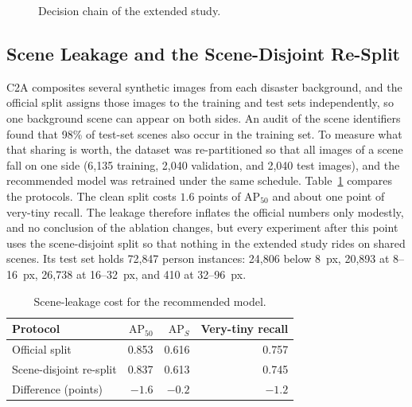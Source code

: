 \begin{figure}[tbp]
  \centering
  \caption{Decision chain of the extended study.}
  \label{fig:partbchain}
\end{figure}

\subsection{Scene Leakage and the Scene-Disjoint Re-Split}
\label{sec:leak}
C2A composites several synthetic images from each disaster background, and the
official split assigns those images to the training and test sets
independently, so one background scene can appear on both sides. An audit of
the scene identifiers found that 98\% of test-set scenes also occur in the
training set. To measure what that sharing is worth, the dataset was
re-partitioned so that all images of a scene fall on one side (6{,}135
training, 2{,}040 validation, and 2{,}040 test images), and the recommended
model was retrained under the same schedule. Table~\ref{tab:leak} compares the
protocols. The clean split costs $1.6$ points of $\mathrm{AP}_{50}$ and about
one point of very-tiny recall. The leakage therefore inflates the official
numbers only modestly, and no conclusion of the ablation changes, but every
experiment after this point uses the scene-disjoint split so that nothing in
the extended study rides on shared scenes. Its test set holds 72{,}847 person
instances: 24{,}806 below 8~px, 20{,}893 at 8--16~px, 26{,}738 at 16--32~px,
and 410 at 32--96~px.

\begin{table}[tbp]
  \centering
  \caption{Scene-leakage cost for the recommended model.}
  \label{tab:leak}
  \begin{tabular}{@{}l r r r@{}}
    \toprule
    Protocol & $\mathrm{AP}_{50}$ & $\mathrm{AP}_S$ & Very-tiny recall \\
    \midrule
    Official split          & 0.853 & 0.616 & 0.757 \\
    Scene-disjoint re-split & 0.837 & 0.613 & 0.745 \\
    Difference (points)     & $-1.6$ & $-0.2$ & $-1.2$ \\
    \bottomrule
  \end{tabular}
\end{table}

